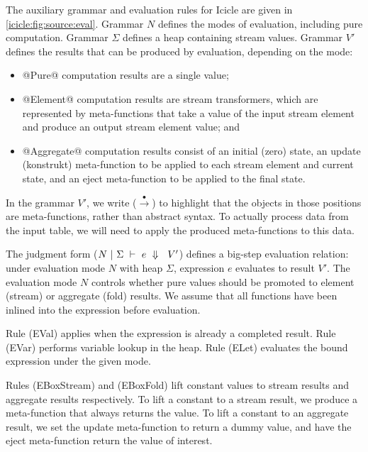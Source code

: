 The auxiliary grammar and evaluation rules for Icicle are given in \cref{icicle:fig:source:eval}.
Grammar $N$ defines the modes of evaluation, including pure computation.
Grammar $\Sigma$ defines a heap containing stream values.
Grammar $V'$ defines the results that can be produced by evaluation, depending on the mode:
\begin{itemize}
\item
@Pure@ computation results are a single value;
\item
@Element@ computation results are stream transformers, which are represented by meta-functions that take a value of the input stream element and produce an output stream element value; and
\item
@Aggregate@ computation results consist of an initial (zero) state, an update (konstrukt) meta-function to be applied to each stream element and current state, and an eject meta-function to be applied to the final state.
\end{itemize}



In the grammar $V'$, we write ($\stackrel{\bullet}{\to}$) to highlight that the objects in those positions are meta-functions, rather than abstract syntax.
To actually process data from the input table, we will need to apply the produced meta-functions to this data.

The judgment form ($N~|~\Sigma~\vdash~e~\Downarrow~~V'$) defines a big-step evaluation relation: under evaluation mode $N$ with heap $\Sigma$, expression $e$ evaluates to result $V'$.
The evaluation mode $N$ controls whether pure values should be promoted to element (stream) or aggregate (fold) results. 
We assume that all functions have been inlined into the expression before evaluation.

Rule (EVal) applies when the expression is already a completed result.
Rule (EVar) performs variable lookup in the heap.
Rule (ELet) evaluates the bound expression under the given mode.



Rules (EBoxStream) and (EBoxFold) lift constant values to stream results and aggregate results respectively.
To lift a constant to a stream result, we produce a meta-function that always returns the value.
To lift a constant to an aggregate result, we set the update meta-function to return a dummy value, and have the eject meta-function return the value of interest.

